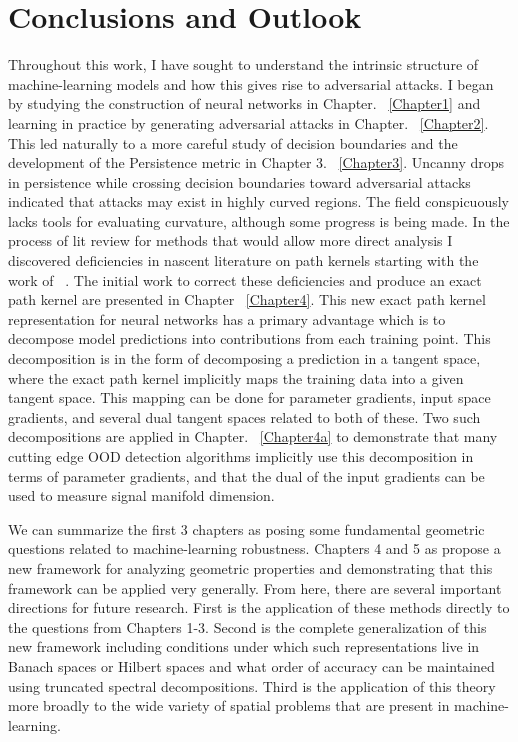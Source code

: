 \chapter{Conclusions and Outlook}

\label{Chapter5} %

Throughout this work, I have sought to understand the intrinsic
structure of machine-learning models and how this gives
rise to adversarial attacks. I began by studying the construction of
neural networks in Chapter. ~\ref{Chapter1} and learning in practice by generating adversarial
attacks in Chapter. ~\ref{Chapter2}. This led naturally to a more careful study of decision
boundaries and the development of the Persistence metric in Chapter
3. ~\ref{Chapter3}. Uncanny drops in persistence while crossing
decision boundaries toward adversarial attacks indicated that attacks
may exist in highly curved regions. The field conspicuously lacks
tools for evaluating curvature, although some progress is being
made. In the process of lit review for methods that would allow more
direct analysis I discovered deficiencies in nascent literature on
path kernels starting with the work of ~\citet{domingos2020}. The
initial work to correct these deficiencies and produce an exact path
kernel are presented in Chapter ~\ref{Chapter4}. This new exact path kernel
representation for neural networks has a primary advantage which is to
decompose model predictions into contributions from each training
point. This decomposition is in the form of decomposing a prediction
in a tangent space, where the exact path kernel implicitly maps the
training data into a given tangent space. This mapping can be done for
parameter gradients, input space gradients, and several dual tangent
spaces related to both of these. Two such decompositions are applied
in Chapter. ~\ref{Chapter4a} to demonstrate that many cutting edge OOD
detection algorithms implicitly use this decomposition in terms of
parameter gradients, and that the dual of the input gradients can be
used to measure signal manifold dimension.

We can summarize the first 3 chapters as posing some fundamental
geometric questions related to machine-learning robustness. 
Chapters 4 and 5 as propose a new framework for analyzing geometric
properties and demonstrating that this framework can be applied very
generally. From here, there are several important directions for
future research. First is the application of these methods directly to
the questions from Chapters 1-3. Second is the complete generalization
of this new framework including conditions under which such
representations live in Banach spaces or Hilbert spaces and what order
of accuracy can be maintained using truncated spectral
decompositions. Third is the application of this theory more broadly
to the wide variety of spatial problems that are present in
machine-learning.

